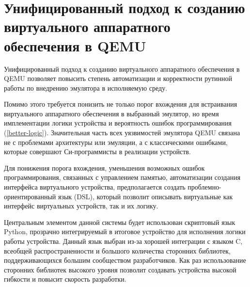 \section{Унифицированный подход к созданию виртуального аппаратного обеспечения в QEMU}\label{sec:ch1/sec4}

Унифицированный подход к созданию виртуального аппаратного обеспечения в QEMU позволяет
повысить степень автоматизации и корректности рутинной работы по внедрению
эмулятора в исполняемую среду.

Помимо этого требуется понизить не только порог вхождения для встраивания виртуального аппаратного обеспечения
в выбранный эмулятор, но время имплементации логики устройства и вероятность ошибок программирования (\cref{better-logic}).
Значительная часть всех уязвимостей эмулятора QEMU связана не с проблемами архитектуры или эмуляции,
а с классическими ошибками, которые совершают Си-программисты в реализации устройств.


Для понижения порога вхождения, уменьшения возможных ошибок программирования,
связанных с управлением памятью, автоматизации создания интерфейса виртуального
устройства, предполагается создать проблемно-ориентированный язык (DSL), который позволит
описывать виртуальные как интерфейс виртуальных устройств, так и их логику.

Центральным элементом данной системы будет использован скриптовый язык Python, прозрачно интегрируемый
в итоговое устройство для исполнения логики работы устройства.
Данный язык выбран из-за хорошей интеграции с языком C, всеобщей распространенности и большого
количества сторонних библиотек, поддерживающихся большим сообществом разработчиков.
Как раз использование сторонних библиотек высокого уровня позволит создавать устройства
высокой гибкости и повысит скорость разработки.



